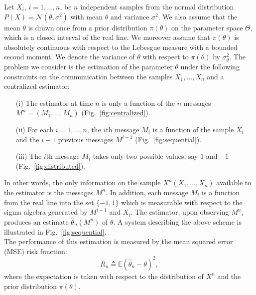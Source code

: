 \documentclass[letterpaper, conference]{IEEEtran}      %
\begin{document}
Let $X_i$, $i=1,\ldots,n$, be $n$ independent samples from the normal distribution $P(X) = \mathcal N(\theta,\sigma^2)$ with mean $\theta$ and variance $\sigma^2$. We also assume that the mean $\theta$ is drawn once from a prior distribution $\pi(\theta)$ on the parameter space $\Theta$, which is a closed interval of the real line. We moreover assume that $\pi(\theta)$ is absolutely continuous with respect to the Lebesgue measure with a bounded second moment. We denote the variance of $\theta$ with respect to $\pi(\theta)$ by $\sigma_\theta^2$. The problem we consider is the estimation of the parameter $\theta$ under the following constraints on the communication between the samples $X_1,\ldots,X_n$ and a centralized estimator: 
\begin{itemize}
\item[(i)] The estimator at time $n$ is only a function of the $n$ messages $M^n = \left(M_1,\ldots,M_n \right)$ (Fig.~\ref{fig:centralized}).
\item[(ii)] For each $i=1,\ldots,n$, the $i$th message $M_i$ is a function of the sample $X_i$ and the $i-1$ previous messages $M^{i-1}$ (Fig.~\ref{fig:sequential}).
\item[(iii)] The $i$th message $M_i$ takes only two possible values, say $1$ and $-1$ (Fig.~\ref{fig:distributed}).
\end{itemize}
In other words, the only information on the sample $X^n \left(X_1,\ldots,X_n\right)$ available to the estimator is the messages $M^n$. In addition, each message $M_i$ is a function from the real line into the set $\{-1,1\}$ which is measurable with respect to the sigma algebra generated by $M^{i-1}$ and $X_i$. The estimator, upon observing $M^n$, produces an estimate $\widehat{\theta}_n(M^n)$ of $\theta$. A system describing the above scheme is illustrated in Fig.~\ref{fig:sequential}. \\

The performance of this estimation is measured by the mean squared error (MSE) risk function:
\begin{equation}
\label{eq:error_def}
R_n \triangleq \mathbb E\left(\widehat{\theta}_n - \theta \right)^2,
\end{equation}
where the expectation is taken with respect to the distribution of $X^n$ and the prior distribution $\pi(\theta)$.  \\
\end{document}
